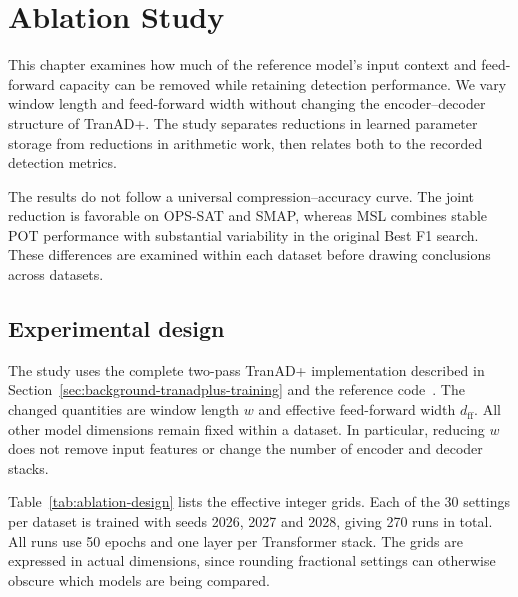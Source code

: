\chapter{Ablation Study}
\label{chap:ablation}

This chapter examines how much of the reference model's input context and
feed-forward capacity can be removed while retaining detection performance.
We vary window length and feed-forward width without changing the
encoder--decoder structure of TranAD+. The study separates reductions in
learned parameter storage from reductions in arithmetic work, then relates
both to the recorded detection metrics.

The results do not follow a universal compression--accuracy curve.
The joint reduction is favorable on \ac{OPS-SAT} and \ac{SMAP}, whereas
\ac{MSL} combines stable \ac{POT} performance with substantial variability
in the original Best F1 search. These differences are examined within each
dataset before drawing conclusions across datasets.

\section{Experimental design}
\label{sec:ablation-design}
The study uses the complete two-pass TranAD+ implementation described in
Section~\ref{sec:background-tranadplus-training} and the reference
code~\cite{TranADPlusReferenceCode}. The changed quantities
are window length \(w\) and effective feed-forward width
\(d_{\mathrm{ff}}\). All other model dimensions remain fixed within a
dataset. In particular, reducing \(w\) does not remove input features or
change the number of encoder and decoder stacks.

Table~\ref{tab:ablation-design} lists the effective integer grids. Each
of the \num{30} settings per dataset is trained with seeds
\num{2026}, \num{2027} and \num{2028}, giving \num{270} runs in total.
All runs use \num{50} epochs and one layer per Transformer stack.
The grids are expressed in actual dimensions, since rounding fractional
settings can otherwise obscure which models are being compared.

